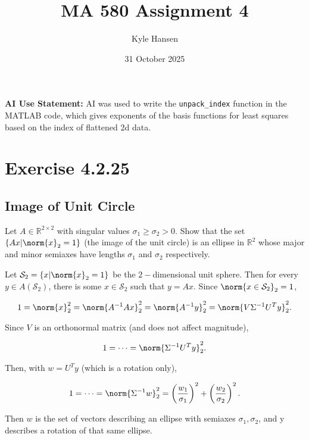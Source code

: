 \documentclass{template}
\title{MA 580 Assignment 4}
\author{Kyle Hansen}
\date{31 October 2025}
\begin{document}
\maketitle

\textbf{AI Use Statement: }AI was used to write the \verb|unpack_index| function in the MATLAB code, which gives exponents of the basis functions for least squares based on the index of flattened 2d data.

\section{Exercise 4.2.25}

\subsection{Image of Unit Circle}

Let $A \in \mathbb{R}^{2\times 2}$ with singular values $\sigma_1 \geq \sigma_2 > 0$. Show that the set $\left\{ Ax | \norm{x}_2 = 1  \right\}$ (the image of the unit circle) is an ellipse in $\mathbb{R}^2$ whose major and minor semiaxes have lengths $\sigma_1$ and $\sigma_2$ respectively.

Let $\mathcal{S}_2 = \left\{ x | \norm{x}_2 = 1 \right\}$ be the $2-$dimensional unit sphere. Then for every $y \in A(\mathcal{S}_2)$, there is some $x \in \mathcal{S}_2$ such that $y=Ax$. Since $\norm{x \in \mathcal{S}_2}_2 = 1$,

\begin{equation}
  1 = \norm{x}_2^2 = \norm{A^{-1}Ax}_2^2 = \norm{A^{-1}y}_2^2 = \norm{V\Sigma^{-1} U^T y}_2^2.
\end{equation}

Since $V$ is an orthonormal matrix (and does not affect magnitude), 

\begin{equation}
  1 = \cdots = \norm{\Sigma^{-1} U^T y}_2^2.
\end{equation}

Then, with $w = U^T y$ (which is a rotation only),

\begin{equation}
  1 = \cdots = \norm{\Sigma^{-1} w}_2^2 = \left(\frac{w_1}{\sigma_1}\right)^2 + \left(\frac{w_2}{\sigma_2}\right)^2.
\end{equation}

Then $w$ is the set of vectors describing an ellipse with semiaxes $\sigma_1, \sigma_2$, and y describes a rotation of that same ellipse.
\end{document}
